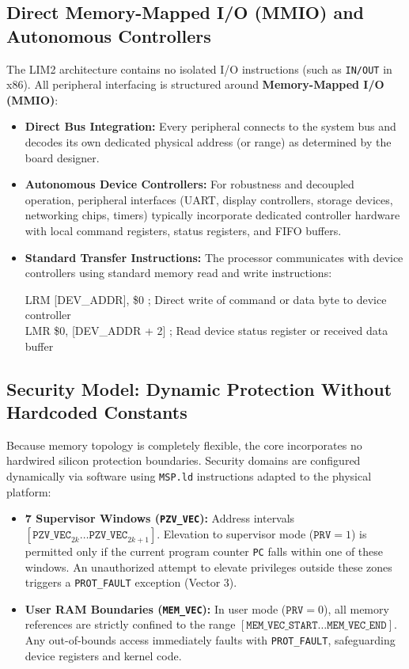 \documentclass[11pt,a4paper]{article}
\newcommand{\reg}{\$}
\begin{document}
\subsection{Direct Memory-Mapped I/O (MMIO) and Autonomous Controllers}
The LIM2 architecture contains no isolated I/O instructions (such as \texttt{IN/OUT} in x86). All peripheral interfacing is structured around \textbf{Memory-Mapped I/O (MMIO)}:
\begin{itemize}[leftmargin=10pt,itemsep=1pt,topsep=1pt,parsep=0pt]
    \item \textbf{Direct Bus Integration:} Every peripheral connects to the system bus and decodes its own dedicated physical address (or range) as determined by the board designer.
    \item \textbf{Autonomous Device Controllers:} For robustness and decoupled operation, peripheral interfaces (UART, display controllers, storage devices, networking chips, timers) typically incorporate dedicated controller hardware with local command registers, status registers, and FIFO buffers.
    \item \textbf{Standard Transfer Instructions:} The processor communicates with device controllers using standard memory read and write instructions:
    \begin{center}
    \footnotesize\ttfamily
    LRM [DEV\_ADDR], \reg0 \quad\color{limmuted}; Direct write of command or data byte to device controller\\
    LMR \reg0, [DEV\_ADDR + 2] \quad\color{limmuted}; Read device status register or received data buffer
    \end{center}
\end{itemize}

\subsection{Security Model: Dynamic Protection Without Hardcoded Constants}
Because memory topology is completely flexible, the core incorporates no hardwired silicon protection boundaries. Security domains are configured dynamically via software using \texttt{MSP.ld} instructions adapted to the physical platform:
\begin{itemize}[leftmargin=10pt,itemsep=1pt,topsep=1pt,parsep=0pt]
    \item \textbf{7 Supervisor Windows (\texttt{PZV\_VEC}):} Address intervals \([\texttt{PZV\_VEC}_{2k} \dots \texttt{PZV\_VEC}_{2k+1}]\). Elevation to supervisor mode (\(\texttt{PRV}=1\)) is permitted only if the current program counter \texttt{PC} falls within one of these windows. An unauthorized attempt to elevate privileges outside these zones triggers a \texttt{PROT\_FAULT} exception (Vector 3).
    \item \textbf{User RAM Boundaries (\texttt{MEM\_VEC}):} In user mode (\(\texttt{PRV}=0\)), all memory references are strictly confined to the range \([\texttt{MEM\_VEC\_START} \dots \texttt{MEM\_VEC\_END}]\). Any out-of-bounds access immediately faults with \texttt{PROT\_FAULT}, safeguarding device registers and kernel code.
\end{itemize}
\end{document}
